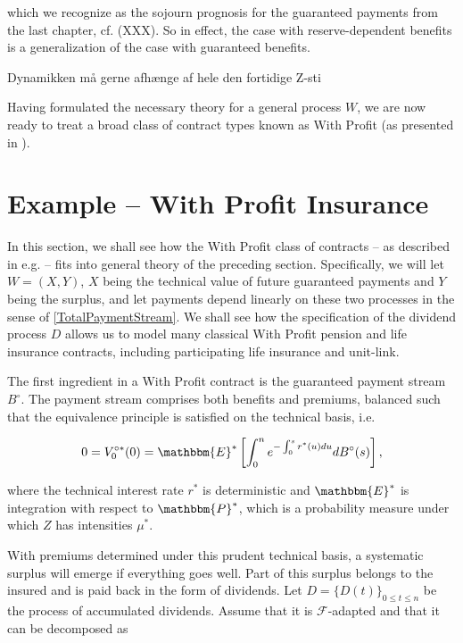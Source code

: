 \documentclass{book}
\newcommand{\1}[1]{\mathbbm{1}_{\left\lbrace #1 \right\rbrace}}
\newcommand{\expecStar}[1][def]{\mathbbm{E}^* \left[ #1 \right]}
\theoremstyle{break}
\theoremstyle{remark}
\newenvironment{remark}
  {\pushQED{\qed}\renewcommand{\qedsymbol}{\scalebox{1.4}{$\circ$}}\remarkx}
  {\popQED\endremarkx}
\numberwithin{equation}{section}
\begin{document}
which we recognize as the sojourn prognosis for the guaranteed payments from the last chapter, cf. (XXX). So in effect, the case with reserve-dependent benefits is a generalization of the case with guaranteed benefits.

\begin{remark}
	Dynamikken må gerne afhænge af hele den fortidige Z-sti
\end{remark}


Having formulated the necessary theory for a general process $W$, we are now ready to treat a broad class of contract types known as With Profit (as presented in \cite{Liv2Bog}).

\section{Example -- With Profit Insurance}
In this section, we shall see how the With Profit class of contracts -- as described in e.g. \cite{Liv2Bog} -- fits into general theory of the preceding section. Specifically, we will let $W=(X,Y)$, $X$ being the technical value of future guaranteed payments and $Y$ being the surplus, and let payments depend linearly on these two processes in the sense of \ref{TotalPaymentStream}. We shall see how the specification of the dividend process $D$ allows us to model many classical With Profit pension and life insurance contracts, including participating life insurance and unit-link.

The first ingredient in a With Profit contract is the guaranteed payment stream $B^\circ$. The payment stream comprises both benefits and premiums, balanced such that the equivalence principle is satisfied on the technical basis, i.e.

\begin{align*}
0 = V_0^{\circ*}(0) = \expecStar[\int_0^n e^{-\int_0^s r^*(u) du} dB^\circ(s)],
\end{align*}

where the technical interest rate $r^*$ is deterministic and $\mathbbm{E}^*$ is integration with respect to $\mathbbm{P}^*$, which is a probability measure under which $Z$ has intensities $\mu^*$.

With premiums determined under this prudent technical basis, a systematic surplus will emerge if everything goes well. Part of this surplus belongs to the insured and is paid back in the form of dividends. Let $D = \{ D(t) \}_{0 \leq t \leq n}$ be the process of accumulated dividends. Assume that it is $\mathcal{F}$-adapted and that it can be decomposed as
\end{document}
